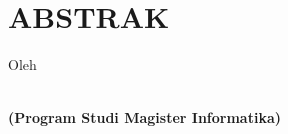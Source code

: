 \clearpage
\chapter*{ABSTRAK}
\begin{center}
	\singlespacing
    \large \bfseries \MakeUppercase{\thetitle}

    \normalsize \normalfont Oleh

    \bfseries \large \theauthor\\
    \normalsize (Program Studi Magister Informatika)
    \bigskip
\end{center}

\begin{singlespace}

\blindtext

\end{singlespace}
\clearpage